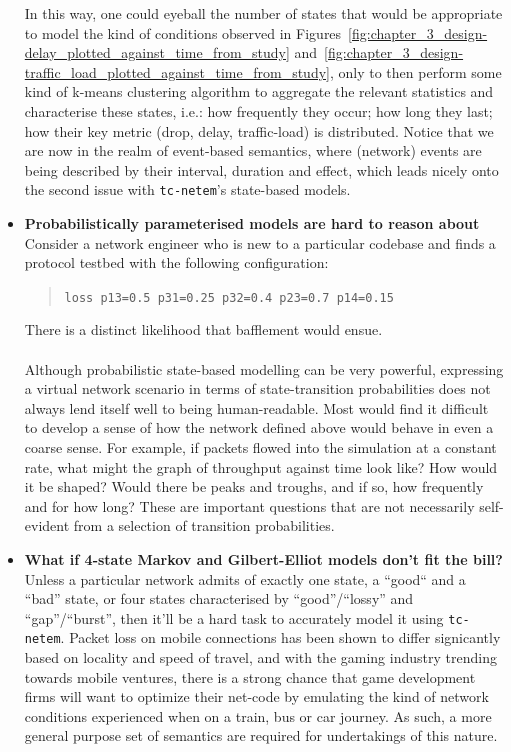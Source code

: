\begin{itemize}
    In this way, one could eyeball the number of states that would be appropriate to model the kind of conditions
    observed in Figures~\ref{fig:chapter_3_design-delay_plotted_against_time_from_study}
    and~\ref{fig:chapter_3_design-traffic_load_plotted_against_time_from_study}, only to then perform some kind of
    k-means clustering algorithm to aggregate the relevant statistics and characterise these states, i.e.: how
    frequently they occur; how long they last; how their key metric (drop, delay, traffic-load) is distributed.
    Notice that we are now in the realm of event-based semantics, where (network) events are being described by their
    interval, duration and effect, which leads nicely onto the second issue with \texttt{tc-netem}'s state-based
    models.
    \newpage
    \item \textbf{Probabilistically parameterised models are hard to reason about} \\
    Consider a network engineer who is new to a particular codebase and finds a protocol testbed with the following
    configuration:
    \begin{quote}
        \texttt{loss p13=0.5 p31=0.25 p32=0.4 p23=0.7 p14=0.15}
    \end{quote}
    There is a distinct likelihood that bafflement would ensue. \\ \\
    Although probabilistic state-based modelling can be very powerful, expressing a virtual network scenario in terms
    of state-transition probabilities does not always lend itself well to being human-readable. Most would find it
    difficult to develop a sense of how the network defined above would behave in even a coarse sense. For example,
    if packets flowed into the simulation at a constant rate, what might the graph of throughput against time look
    like? How would it be shaped? Would there be peaks and troughs, and if so, how frequently and for how long? These
    are important questions that are not necessarily self-evident from a selection of transition probabilities.
    \item \textbf{What if 4-state Markov and Gilbert-Elliot models don't fit the bill?} \\
    Unless a particular network admits of exactly one state, a ``good`` and a ``bad'' state, or four states
    characterised by ``good''/``lossy'' and ``gap''/``burst'', then it'll be a hard task to accurately model it
    using \texttt{tc-netem}. Packet loss on mobile connections has been shown to differ signicantly based on locality
    and speed of travel\cite{mobile_broadband_networks_under_mobility}, and with the gaming industry trending towards
    mobile ventures\cite{statista_mobile_gaming, rise_of_mobile_gaming}, there is a strong chance that game development
    firms will want to optimize their net-code by emulating the kind of network conditions experienced when on a
    train, bus or car journey. As such, a more general purpose set of semantics are required for undertakings of this
    nature.
\end{itemize}

